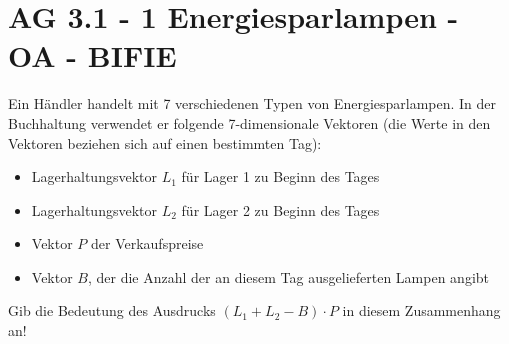 \section{AG 3.1 - 1 Energiesparlampen - OA - BIFIE}

\begin{beispiel}[AG 3.1]{1} %
Ein Händler handelt mit 7 verschiedenen Typen von Energiesparlampen. In der Buchhaltung verwendet er folgende 7-dimensionale Vektoren (die Werte in den Vektoren beziehen sich auf einen bestimmten Tag):
\begin{itemize}
	\item Lagerhaltungsvektor $L_{1}$ für Lager 1 zu Beginn des Tages
	\item Lagerhaltungsvektor $L_{2}$ für Lager 2 zu Beginn des Tages
	\item Vektor $P$ der Verkaufspreise
	\item Vektor $B$, der die Anzahl der an diesem Tag ausgelieferten Lampen angibt
\end{itemize}

Gib die Bedeutung des Ausdrucks $(L_{1}+L_{2}-B)\cdot P$ in diesem Zusammenhang an!

\end{beispiel}